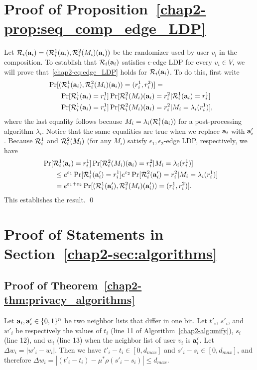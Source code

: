 {\section{Proof of Proposition~\ref{chap2-prop:seq_comp_edge_LDP}}
\label{chap2-sec:proof_seq_comp_edge_LDP}
Let $\mathcal{R}_i(\mathbf{a}_i) = (\mathcal{R}_i^1(\mathbf{a}_i), \mathcal{R}_i^2(M_i)(\mathbf{a}_i))$ be the
randomizer used by user $v_i$ in the composition. To establish that
$\mathcal{R}_i(\mathbf{a}_i)$ satisfies $\epsilon$-edge LDP for every $v_i \in V$, we will
prove that~\eqref{chap2-eq:edge_LDP} holds for $\mathcal{R}_i(\mathbf{a}_i)$. To do this, first write
\begin{align*}
  &\;\Pr[(\mathcal{R}_i^1(\mathbf{a}_i), \mathcal{R}_i^2(M_i)(\mathbf{a}_i)) = (r_i^1, r_i^2)] = \\
  &\qquad\Pr[\mathcal{R}_i^1(\mathbf{a}_i) = r_i^1]\Pr[\mathcal{R}_i^2(M_i)(\mathbf{a}_i) = r_i^2 | \mathcal{R}_i^1(\mathbf{a}_i) = r_i^1] \\
  &\qquad\Pr[\mathcal{R}_i^1(\mathbf{a}_i) = r_i^1]\Pr[\mathcal{R}_i^2(M_i)(\mathbf{a}_i) = r_i^2 | M_i = \lambda_i(r_i^1)],
\end{align*}
where the last equality follows because $M_i = \lambda_i(\mathcal{R}_i^1(\mathbf{a}_i))$ for a post-processing algorithm $\lambda_i$.
Notice that the same equalities are true when we replace $\mathbf{a}_i$ with $\mathbf{a}_i'$.
Because $\mathcal{R}_i^1$ and $\mathcal{R}_i^2(M_i)$ (for any $M_i$) satisfy $\epsilon_1, \epsilon_2$-edge LDP, respectively,
we have
\begin{align*}
  &\;\Pr[\mathcal{R}_i^1(\mathbf{a}_i) = r_i^1]\Pr[\mathcal{R}_i^2(M_i)(\mathbf{a}_i) = r_i^2 | M_i = \lambda_i(r_i^1)] \\
  &\qquad\leq e^{\varepsilon_1}\Pr[\mathcal{R}_i^1(\mathbf{a}_i') = r_i^1]e^{\varepsilon_2}\Pr[\mathcal{R}_i^2(\mathbf{a}_i') = r_i^2 | M_i = \lambda_i(r_i^1)] \\
  &\qquad= e^{\varepsilon_1 + \varepsilon_2} \Pr[(\mathcal{R}_i^1(\mathbf{a}_i'), \mathcal{R}_i^2(M_i)(\mathbf{a}_i')) = (r_i^1, r_i^2)].
\end{align*}
This establishes the result. \qed

\section{Proof of Statements in Section~\ref{chap2-sec:algorithms}}
\label{chap2-sec:proof_algorithms}
\subsection{Proof of Theorem~\ref{chap2-thm:privacy_algorithms}}
Let $\mathbf{a}_i, \mathbf{a}'_i \in \{0,1\}^n$ be two neighbor lists that differ in one bit.
Let $t'_i$, $s'_i$, and $w'_i$ be respectively the values of $t_i$ (line 11 of Algorithm~\ref{chap2-alg:unify}), $s_i$ (line 12), and $w_i$ (line 13) when the neighbor list of user $v_i$ is $\mathbf{a}'_i$.
Let $\Delta w_i = |w'_i - w_i|$.
Then we have $t'_i - t_i \in [0,d_{max}]$ and $s'_i - s_i \in [0,d_{max}]$, and therefore $\Delta w_i = |(t'_i - t_i) - \mu^* \rho(s'_i - s_i)| \leq d_{max}$.

}
